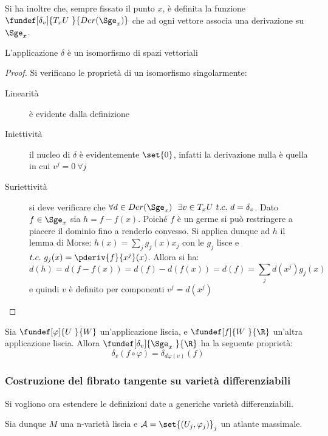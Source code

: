 Si ha inoltre che, sempre fissato il punto $x$, è definita la funzione $\fundef[\delta_v]{T_x U~}{Der(\Sge_x)}$ che ad ogni vettore associa una derivazione su $\Sge_x$.

\begin{lemma}
L'applicazione $\delta$ è un isomorfismo di spazi vettoriali
\end{lemma}
\begin{proof}
Si verificano le proprietà di un isomorfismo singolarmente:
\begin{description}
\item[Linearità] è evidente dalla definizione
\item[Iniettività] il nucleo di $\delta$ è evidentemente $\set{0}$, infatti la derivazione nulla è quella in cui $v^j = 0~ \forall j$
\item[Suriettività] si deve verificare che $\forall d\in Der(\Sge_x)~~ \exists v\in T_x U~ t.c.~ d = \delta_v$. Dato $f\in \Sge_x$ sia $h = f -f(x)$. Poiché $f$ è un germe si può restringere a piacere il dominio fino a renderlo convesso. Si applica dunque ad $h$ il lemma di Morse: $h(x) = \sum_j g_j(x)x_j$ con le $g_j$ lisce e $t.c.~ g_j(x) = \pderiv{f}{x^j}(x)$. Allora si ha:
\begin{equation*}
d(h) = d(f - f(x)) = d(f) - d(f(x)) = d(f) = \sum_jd(x^j)g_j(x) 
\end{equation*}
e quindi $v$ è definito per componenti $v^j = d(x^j)$
\end{description}
\end{proof}

\begin{oss}
Sia $\fundef[\varphi]{U~}{W}$ un'applicazione liscia, e $\fundef[f]{W~}{\R}$ un'altra applicazione liscia. Allora $\fundef[\delta_v]{\Sge_x~}{\R}$ ha la seguente proprietà:
\begin{equation*}
\delta_v(f\circ \varphi) = \delta_{d\varphi (v)}(f)
\end{equation*}
\end{oss}

\subsubsection{Costruzione del fibrato tangente su varietà differenziabili} %

Si vogliono ora estendere le definizioni date a generiche varietà differenziabili.

Sia dunque $M$ una n-varietà liscia e $\mathcal{A} = \set{(U_j, \varphi _j)}_j$ un atlante massimale.

